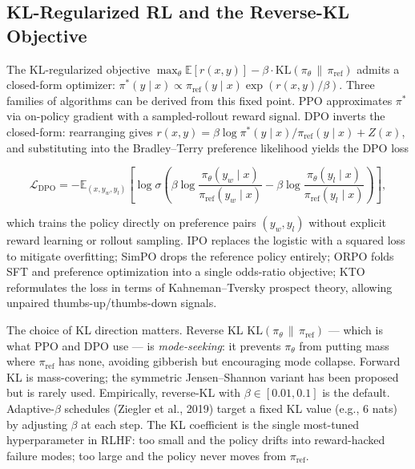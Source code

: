 \documentclass{article}
\begin{document}
\subsection{KL-Regularized RL and the Reverse-KL Objective}\label{kl-regularized-rl-and-the-reverse-kl-objective}

The KL-regularized objective \(\max_\theta \mathbb{E}[r(x, y)] - \beta \cdot \mathrm{KL}(\pi_\theta \,\|\, \pi_{\text{ref}})\) admits a closed-form optimizer: \(\pi^*(y \mid x) \propto \pi_{\text{ref}}(y \mid x) \exp(r(x, y)/\beta)\). Three families of algorithms can be derived from this fixed point. PPO approximates \(\pi^*\) via on-policy gradient with a sampled-rollout reward signal. DPO \citep{rafailov2023directpreferenceop} inverts the closed-form: rearranging gives \(r(x, y) = \beta \log \pi^*(y \mid x)/\pi_{\text{ref}}(y \mid x) + Z(x)\), and substituting into the Bradley--Terry preference likelihood yields the DPO loss

\[\mathcal{L}_{\mathrm{DPO}} = -\mathbb{E}_{(x, y_w, y_l)} \left[ \log \sigma\!\left( \beta \log \frac{\pi_\theta(y_w \mid x)}{\pi_{\text{ref}}(y_w \mid x)} - \beta \log \frac{\pi_\theta(y_l \mid x)}{\pi_{\text{ref}}(y_l \mid x)} \right) \right],\]

which trains the policy directly on preference pairs \((y_w, y_l)\) without explicit reward learning or rollout sampling. IPO \citep{azar2023ageneraltheoretica} replaces the logistic with a squared loss to mitigate overfitting; SimPO \citep{meng2024simposimpleprefere} drops the reference policy entirely; ORPO \citep{hong2024orpomonolithicpref} folds SFT and preference optimization into a single odds-ratio objective; KTO \citep{ethayarajh2024ktomodelalignmenta} reformulates the loss in terms of Kahneman--Tversky prospect theory, allowing unpaired thumbs-up/thumbs-down signals.

The choice of KL direction matters. Reverse KL \(\mathrm{KL}(\pi_\theta \,\|\, \pi_{\text{ref}})\) --- which is what PPO and DPO use --- is \emph{mode-seeking}: it prevents \(\pi_\theta\) from putting mass where \(\pi_{\text{ref}}\) has none, avoiding gibberish but encouraging mode collapse. Forward KL is mass-covering; the symmetric Jensen--Shannon variant has been proposed but is rarely used. Empirically, reverse-KL with \(\beta \in [0.01, 0.1]\) is the default. Adaptive-\(\beta\) schedules (Ziegler et al., 2019) target a fixed KL value (e.g., 6 nats) by adjusting \(\beta\) at each step. The KL coefficient is the single most-tuned hyperparameter in RLHF: too small and the policy drifts into reward-hacked failure modes; too large and the policy never moves from \(\pi_{\text{ref}}\).
\end{document}
